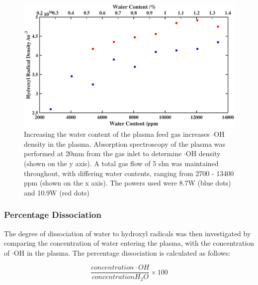 \documentclass[11pt, oneside]{article}   	%
\begin{document}
\begin{figure}
    \centering
    \includegraphics[width=\textwidth]{Figures/BubblerVariationBig}
    \caption{Increasing the water content of the plasma feed gas increases $\cdot$OH density in the plasma. Absorption spectroscopy of the plasma was performed at 20mm from the gas inlet to determine $\cdot$OH density (shown on the y axis). A total gas flow of 5 slm was maintained throughout, with differing water contents, ranging from 2700 - 13400 ppm (shown on the x axis). The powers used were 8.7W (blue dots) and 10.9W (red dots)}
    \label{fig:BubblerVariation}
\end{figure}


\subsubsection{Percentage Dissociation}

The degree of dissociation of water to hydroxyl radicals was then investigated by comparing the concentration of water entering the plasma, with the concentration of $\cdot$OH in the plasma.
The percentage dissociation is calculated as follows:

\begin{equation} \label{eqn:PercentDiss}
	\frac{concentration \cdot OH}{concentration  H_2O} \times 100
\end{equation}
\end{document}
